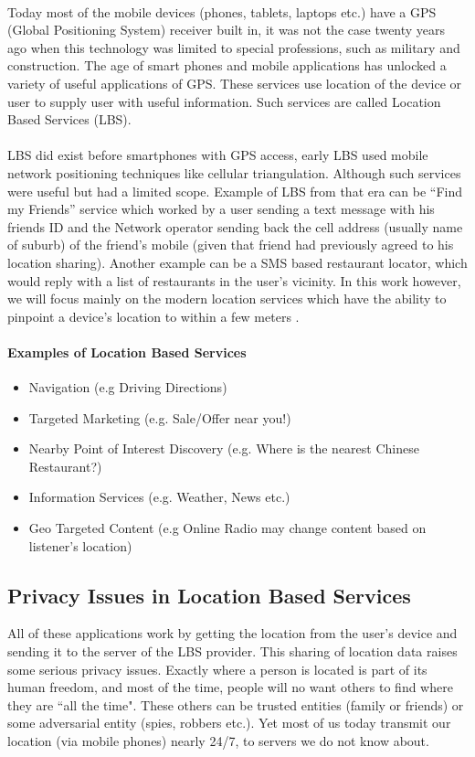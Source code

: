 \documentclass[12pt]{report}
\theoremstyle{named}
\begin{document}
\paragraph{}
Today most of the mobile devices (phones, tablets, laptops etc.) have a GPS (Global Positioning System) receiver built in, it was not the case twenty years ago when this technology was limited to special professions, such as military and construction. The age of smart phones and mobile applications has unlocked a variety of useful applications of GPS. These services use location of the device or user to supply user with useful information. Such services are called Location Based Services (LBS).
\paragraph{}
LBS did exist before smartphones with GPS access, early LBS \cite{lbsShu} used mobile network positioning techniques like cellular triangulation. Although such services were useful but had a limited scope. Example of LBS from that era can be “Find my Friends” service which worked by a user sending a text message with his friends ID and the Network operator sending back the cell address (usually name of suburb) of the friend’s mobile (given that friend had previously agreed to his location sharing). Another example can be a SMS based restaurant locator, which would reply with a list of restaurants in the user’s vicinity. In this work however, we will focus mainly on the modern location services which have the ability to pinpoint a device's location to within a few meters \cite{ TGIS:TGIS1152}.
\paragraph{Examples of Location Based Services}
\begin{itemize}
\item Navigation (e.g Driving Directions)
\item Targeted Marketing (e.g. Sale/Offer near you!)
\item Nearby Point of Interest Discovery (e.g. Where is the nearest Chinese Restaurant?)
\item Information Services (e.g. Weather, News etc.)
\item Geo Targeted Content (e.g Online Radio may change content based on listener's location)
\end{itemize}

\subsection{Privacy Issues in Location Based Services}
All of these applications work by getting the location from the user's device and sending it to the server of the LBS provider. This sharing of location data raises some serious privacy issues. Exactly where a person is located is part of its human freedom, and most of the time, people will no want others to find where they are ``all the time". These others can be trusted entities (family or friends) or some adversarial entity (spies, robbers etc.). Yet most of us today transmit our location (via mobile phones) nearly 24/7, to servers we do not know about.
\end{document}
